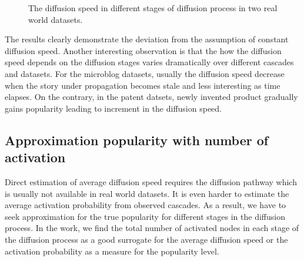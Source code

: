 \begin{figure}[H]
\caption{The diffusion speed in different stages of diffusion process in two real world datasets. }\label{fig:PatentHetero}
\end{figure}

The results clearly demonstrate the deviation from the assumption of constant diffusion speed. Another interesting observation is that the how the diffusion speed depends on the diffusion stages varies dramatically over different cascades and datasets. For the microblog datasets, usually the diffusion speed decrease when the story under propagation becomes stale and less interesting as time elapses. On the contrary, in the patent datsets, newly invented product gradually gains popularity leading to increment in the diffusion speed. 



\subsection{Approximation popularity with number of activation}
Direct estimation of average diffusion speed requires the diffusion pathway which is usually not available in real world datasets. It is even harder to estimate the average activation probability from observed cascades. As a result, we have to seek approximation for the true popularity for different stages in the diffusion process. In the work, we find the total number of activated nodes in each stage of the diffusion process as a good surrogate for the average diffusion speed or the activation probability as a measure for the popularity level. 

